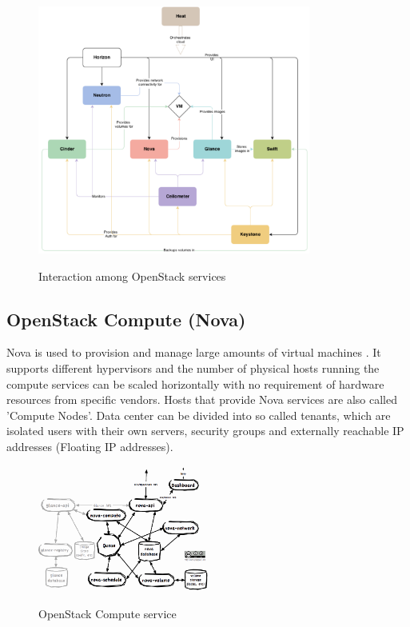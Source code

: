 \begin{figure}[H]
\centering
\includegraphics[width=0.8\textwidth]{images/fundamentals/openstack_conceptual_arch.png}
\caption{Interaction among OpenStack services}\cite{openstack-installjuno}
\end{figure}


\subsection{OpenStack Compute (Nova)}

Nova is used to provision and manage large amounts of virtual machines . It supports different hypervisors and the number of physical hosts running the compute services can be scaled horizontally with no requirement of hardware resources from specific vendors. Hosts that provide Nova services are also called 'Compute Nodes'. Data center can be divided into so called tenants, which are isolated users with their own servers, security groups and externally reachable IP addresses (Floating IP addresses). 

\begin{figure}[H]
\centering
\includegraphics[width=0.5\textwidth]{images/fundamentals/openstack_nova.png}
\caption{OpenStack Compute service} \cite{nova-arch}
\end{figure}

